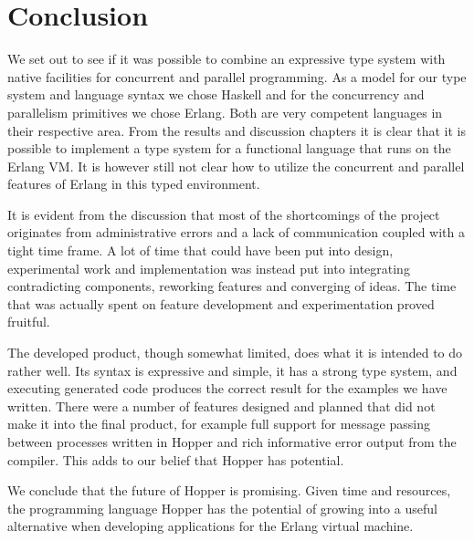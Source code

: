 \chapter{Conclusion}

We set out to see if it was possible to combine an expressive type system with native facilities for concurrent and parallel programming. As a model for our type system and language syntax we chose Haskell and for the concurrency and parallelism primitives we chose Erlang. Both are very competent languages in their respective area. From the results and discussion chapters it is clear that it is possible to implement a type system for a functional language that runs on the Erlang VM. It is however still not clear how to utilize the concurrent and parallel features of Erlang in this typed environment.

It is evident from the discussion that most of the shortcomings of the project originates from administrative errors and a lack of communication coupled with a tight time frame. A lot of time that could have been put into design, experimental work and implementation was instead put into integrating contradicting components, reworking features and converging of ideas. The time that was actually spent on feature development and experimentation proved fruitful. 

The developed product, though somewhat limited, does what it is intended to do rather well. Its syntax is expressive and simple, it has a strong type system, and executing generated code produces the correct result for the examples we have written. There were a number of features designed and planned that did not make it into the final product, for example full support for message passing between processes written in Hopper and rich informative error output from the compiler. This adds to our belief that Hopper has potential. 

We conclude that the future of Hopper is promising. Given time and resources, the programming language Hopper has the potential of growing into a useful alternative when developing applications for the Erlang virtual machine.

